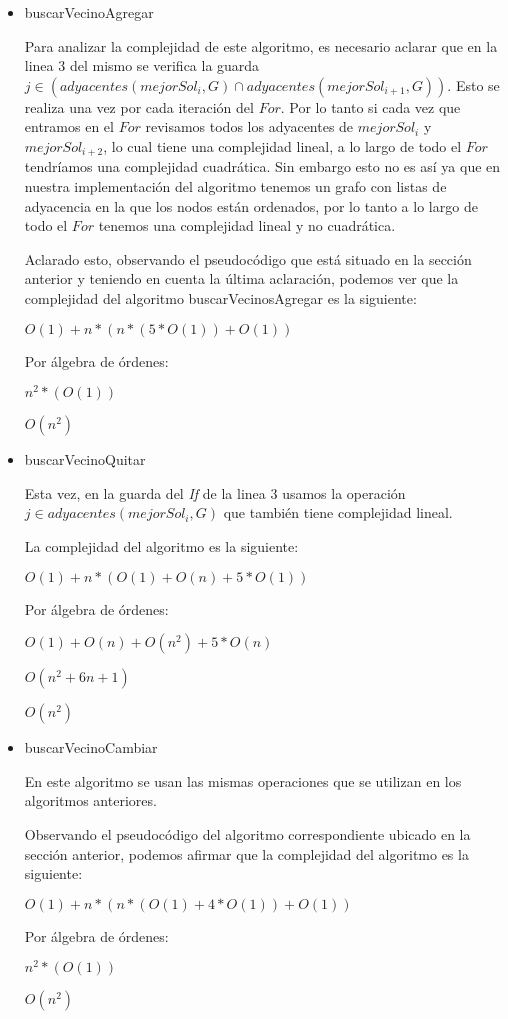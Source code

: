 \begin{itemize}
 \item buscarVecinoAgregar

  Para analizar la complejidad de este algoritmo, es necesario aclarar que en la linea $3$ del mismo se verifica la guarda $j \in (adyacentes(mejorSol_i,G) \cap adyacentes(mejorSol_{i+1},G))$. Esto se realiza una vez por cada iteración del $For$. Por lo tanto si cada vez que entramos en el $For$ revisamos todos los adyacentes de $mejorSol_i$ y $mejorSol_{i+2}$, lo cual tiene una complejidad lineal, a lo largo de todo el $For$ tendríamos una complejidad cuadrática. Sin embargo esto no es así ya que en nuestra implementación del algoritmo tenemos un grafo con listas de adyacencia en la que los nodos están ordenados, por lo tanto a lo largo de todo el $For$ tenemos una complejidad lineal y no cuadrática.

  Aclarado esto, observando el pseudocódigo que está situado en la sección anterior y teniendo en cuenta la última aclaración, podemos ver que la complejidad del algoritmo buscarVecinosAgregar es la siguiente:

  $O(1) + n*(n*(5*O(1))+O(1))$

  Por álgebra de órdenes:

  $n^2 * (O(1))$

  $O(n^2)$

  \item buscarVecinoQuitar

  Esta vez, en la guarda del \emph{If} de la linea $3$ usamos la operación $j \in adyacentes(mejorSol_i, G)$ que también tiene complejidad lineal.

  La complejidad del algoritmo es la siguiente:

  $O(1)+n*(O(1)+O(n)+5*O(1))$

  Por álgebra de órdenes:

  $O(1)+O(n)+O(n^2)+5*O(n)$

  $O(n^2+6n+1)$

  $O(n^2)$

  \item buscarVecinoCambiar

  En este algoritmo se usan las mismas operaciones que se utilizan en los algoritmos anteriores.

  Observando el pseudocódigo del algoritmo correspondiente ubicado en la sección anterior, podemos afirmar que la complejidad del algoritmo es la siguiente:

  $O(1) + n*(n*(O(1) +4*O(1))+O(1))$

  Por álgebra de órdenes:

  $n^2 * (O(1))$

  $O(n^2)$

\end{itemize}


